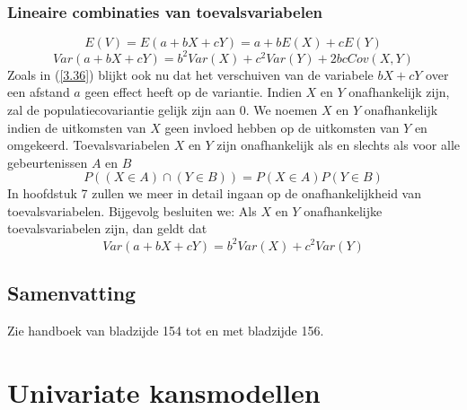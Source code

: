 \documentclass[titlepage]{article}
\numberwithin{equation}{section}
\begin{document}
 \subsubsection{Lineaire combinaties van toevalsvariabelen}
 \begin{equation}
 	E(V) = E(a+bX+cY) = a + bE(X) + cE(Y)
 	\label{3.47}
 \end{equation}
 \begin{equation}
 	Var(a+bX+cY) = b^2Var(X) + c^2Var(Y) + 2bcCov(X,Y)
 	\label{3.48}
 \end{equation}
 Zoals in (\ref{3.36}) blijkt ook nu dat het verschuiven van de variabele $bX + cY$ over een afstand $a$ geen effect heeft op de variantie.\newline\newline
 Indien $X$ en $Y$ onafhankelijk zijn, zal de populatiecovariantie gelijk zijn aan 0. We noemen $X$ en $Y$ onafhankelijk indien de uitkomsten van $X$ geen invloed hebben op de uitkomsten van $Y$ en omgekeerd.\newline\newline
 Toevalsvariabelen $X$ en $Y$ zijn onafhankelijk als en slechts als voor alle gebeurtenissen $A$ en $B$
 \begin{equation}
 	P((X\in A) \cap (Y \in B)) = P(X \in A)P(Y \in B)
 	\label{3.49}
 \end{equation}
 In hoofdstuk 7 zullen we meer in detail ingaan op de onafhankelijkheid van toevalsvariabelen. Bijgevolg besluiten we:\newline\newline
 Als $X$ en $Y$ onafhankelijke toevalsvariabelen zijn, dan geldt dat
 \begin{equation}
 	Var(a+bX+cY) = b^2Var(X)+c^2Var(Y)
 	\label{3.50}
 \end{equation}
 \subsection{Samenvatting}
 Zie handboek van bladzijde 154 tot en met bladzijde 156.
 \section{Univariate kansmodellen}
\end{document}

